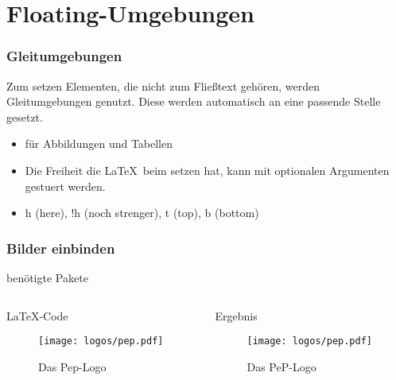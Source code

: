 \section{Floating-Umgebungen}
\begin{frame}
    \frametitle{Gleitumgebungen}
    Zum setzen Elementen, die nicht zum Fließtext gehören, werden Gleitumgebungen genutzt. Diese werden automatisch an eine passende Stelle gesetzt.
    \begin{itemize}
        \item für Abbildungen und Tabellen
        \item Die Freiheit die \LaTeX \ beim setzen hat, kann mit optionalen Argumenten gestuert werden. 
        \item h  (here), !h (noch strenger), t (top), b (bottom)
    \end{itemize}
\end{frame}
\begin{frame}[fragile]
    \frametitle{Bilder einbinden}
    \begin{block}{benötigte Pakete}
        \begin{lstverbatim}
        \usepackage{graphicx}
        \usepackage[labelfont=bf]{caption}
        \end{lstverbatim}
    \end{block}
    \begin{columns}[T]
        \begin{column}{0.6\textwidth}
            \begin{block}{\LaTeX-Code}
                \begin{lstverbatim}
                \begin{figure}
                    \centering
                    \texttt{[image: logos/pep.pdf]}
                    \caption{Das Pep-Logo}
                    \label{fig:peplogo}
                \end{figure}
                \end{lstverbatim}
            \end{block}
        \end{column}
        \begin{column}{0.35\textwidth}
            \begin{block}{Ergebnis}
                \begin{figure}
                    \centering
                    \texttt{[image: logos/pep.pdf]}
                    \caption{Das PeP-Logo}
                    \label{fig:peplogo}
                \end{figure}
            \end{block}
        \end{column}
    \end{columns}
\end{frame}

